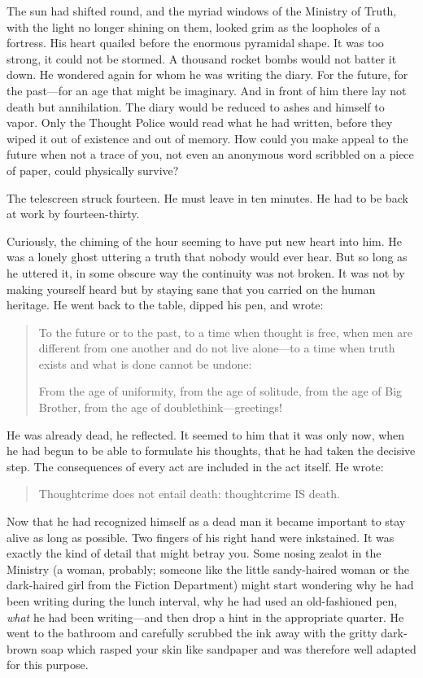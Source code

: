 The sun had shifted round, and the myriad windows of the Ministry of
Truth, with the light no longer shining on them, looked grim as the
loopholes of a fortress. His heart quailed before the enormous pyramidal
shape. It was too strong, it could not be stormed. A thousand rocket
bombs would not batter it down. He wondered again for whom he was
writing the diary. For the future, for the past---for an age that might
be imaginary. And in front of him there lay not death but annihilation.
The diary would be reduced to ashes and himself to vapor. Only the
Thought Police would read what he had written, before they wiped it out
of existence and out of memory. How could you make appeal to the future
when not a trace of you, not even an anonymous word scribbled on a piece
of paper, could physically survive?

The telescreen struck fourteen. He must leave in ten minutes. He had to
be back at work by fourteen-thirty.

Curiously, the chiming of the hour seeming to have put new heart into
him. He was a lonely ghost uttering a truth that nobody would ever hear.
But so long as he uttered it, in some obscure way the continuity was not
broken. It was not by making yourself heard but by staying sane that you
carried on the human heritage. He went back to the table, dipped his
pen, and wrote:

\begin{quotation}
To the future or to the past, to a time when thought is free, when
men are different from one another and do not live alone---to a time
when truth exists and what is done cannot be undone:\par
From the age of uniformity, from the age of solitude, from the age
of Big Brother, from the age of doublethink---greetings!
\end{quotation}

He was already dead, he reflected. It seemed to him that it was only
now, when he had begun to be able to formulate his thoughts, that he had
taken the decisive step. The consequences of every act are included in
the act itself. He wrote:

\begin{quotation}
Thoughtcrime does not entail death: thoughtcrime IS death.
\end{quotation}

Now that he had recognized himself as a dead man it became important to
stay alive as long as possible. Two fingers of his right hand were
inkstained. It was exactly the kind of detail that might betray you.
Some nosing zealot in the Ministry (a woman, probably; someone like the
little sandy-haired woman or the dark-haired girl from the Fiction
Department) might start wondering why he had been writing during the
lunch interval, why he had used an old-fashioned pen, \emph{what} he had
been writing---and then drop a hint in the appropriate quarter. He went
to the bathroom and carefully scrubbed the ink away with the gritty
dark-brown soap which rasped your skin like sandpaper and was therefore
well adapted for this purpose.


